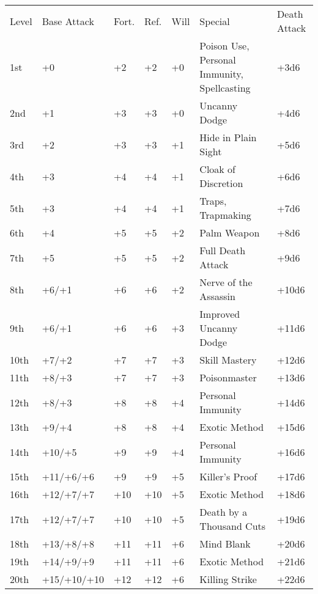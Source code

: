 \begin{table}[htb]
\fontsize{8pt}{9.5pt}\selectfont
\centering
{}
\begin{tabular}{p{.275in}p{.75in}p{0.275in}p{0.275in}p{0.275in}L{3.75in}C{0.575in}}
 Level &Base Attack &Fort. &Ref. &Will &Special& Death Attack\\
1st &+0 &+2 &+2 &+0 &Poison Use, Personal Immunity, Spellcasting&+3d6\\
2nd &+1 &+3 &+3 &+0 &Uncanny Dodge& +4d6\\
3rd &+2 &+3 &+3 &+1 &Hide in Plain Sight& +5d6\\
4th &+3 &+4 &+4 &+1 &Cloak of Discretion& +6d6\\
5th &+3 &+4 &+4 &+1 &Traps, Trapmaking& +7d6\\
6th &+4 &+5 &+5 &+2 &Palm Weapon& +8d6\\
7th &+5 &+5 &+5 &+2 &Full Death Attack& +9d6\\
8th &+6/+1 &+6 &+6 &+2 &Nerve of the Assassin& +10d6\\
9th &+6/+1 &+6 &+6 &+3 &Improved Uncanny Dodge& +11d6\\
10th &+7/+2 &+7 &+7 &+3 &Skill Mastery& +12d6\\
11th &+8/+3 &+7 &+7 &+3 &Poisonmaster& +13d6\\
12th &+8/+3 &+8 &+8 &+4 &Personal Immunity& +14d6\\
13th &+9/+4 &+8 &+8 &+4 &Exotic Method& +15d6\\
14th &+10/+5 &+9 &+9 &+4 &Personal Immunity& +16d6\\
15th &+11/+6/+6 &+9 &+9 &+5 &Killer's Proof& +17d6\\
16th &+12/+7/+7 &+10 &+10 &+5 &Exotic Method& +18d6\\
17th &+12/+7/+7 &+10 &+10 &+5 &Death by a Thousand Cuts& +19d6\\
18th &+13/+8/+8 &+11 &+11 &+6 &Mind Blank& +20d6\\
19th &+14/+9/+9 &+11 &+11 &+6 &Exotic Method& +21d6\\
20th &+15/+10/+10 &+12 &+12 &+6 &Killing Strike& +22d6\\
\end{tabular}
\end{table}


